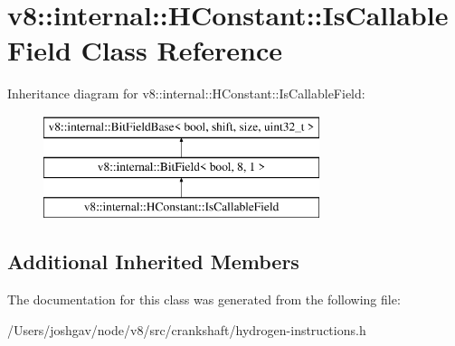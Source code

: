 \hypertarget{classv8_1_1internal_1_1_h_constant_1_1_is_callable_field}{}\section{v8\+:\+:internal\+:\+:H\+Constant\+:\+:Is\+Callable\+Field Class Reference}
\label{classv8_1_1internal_1_1_h_constant_1_1_is_callable_field}
Inheritance diagram for v8\+:\+:internal\+:\+:H\+Constant\+:\+:Is\+Callable\+Field\+:\begin{figure}[H]
\begin{center}
\leavevmode
\includegraphics[height=3.000000cm]{classv8_1_1internal_1_1_h_constant_1_1_is_callable_field}
\end{center}
\end{figure}
\subsection*{Additional Inherited Members}


The documentation for this class was generated from the following file\+:\begin{DoxyCompactItemize}
\item 
/\+Users/joshgav/node/v8/src/crankshaft/hydrogen-\/instructions.\+h\end{DoxyCompactItemize}

